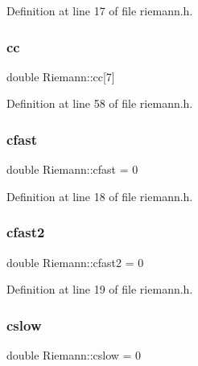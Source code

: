 Definition at line 17 of file riemann.\+h.

\mbox{\label{classRiemann_af41d4b339856cbe04f5d50284821a027}} 
\subsubsection{\texorpdfstring{cc}{cc}}
{\footnotesize\ttfamily double Riemann\+::cc\mbox{[}7\mbox{]}\hspace{0.3cm}{\ttfamily [private]}}



Definition at line 58 of file riemann.\+h.

\mbox{\label{classRiemann_a17e6848dda93ccb5330f94ca46e386b8}} 
\subsubsection{\texorpdfstring{cfast}{cfast}}
{\footnotesize\ttfamily double Riemann\+::cfast = 0\hspace{0.3cm}{\ttfamily [private]}}



Definition at line 18 of file riemann.\+h.

\mbox{\label{classRiemann_ab6927a0076cd1a7ba710310364b92a1b}} 
\subsubsection{\texorpdfstring{cfast2}{cfast2}}
{\footnotesize\ttfamily double Riemann\+::cfast2 = 0\hspace{0.3cm}{\ttfamily [private]}}



Definition at line 19 of file riemann.\+h.

\mbox{\label{classRiemann_a98036eb3323318e58411037d55097c4a}} 
\subsubsection{\texorpdfstring{cslow}{cslow}}
{\footnotesize\ttfamily double Riemann\+::cslow = 0\hspace{0.3cm}{\ttfamily [private]}}




